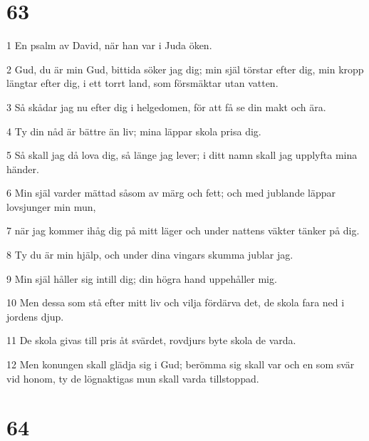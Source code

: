 \chapter{63}

\par 1 En psalm av David, när han var i Juda öken.
\par 2 Gud, du är min Gud, bittida söker jag dig; min själ törstar efter dig, min kropp längtar efter dig, i ett torrt land, som försmäktar utan vatten.
\par 3 Så skådar jag nu efter dig i helgedomen, för att få se din makt och ära.
\par 4 Ty din nåd är bättre än liv; mina läppar skola prisa dig.
\par 5 Så skall jag då lova dig, så länge jag lever; i ditt namn skall jag upplyfta mina händer.
\par 6 Min själ varder mättad såsom av märg och fett; och med jublande läppar lovsjunger min mun,
\par 7 när jag kommer ihåg dig på mitt läger och under nattens väkter tänker på dig.
\par 8 Ty du är min hjälp, och under dina vingars skumma jublar jag.
\par 9 Min själ håller sig intill dig; din högra hand uppehåller mig.
\par 10 Men dessa som stå efter mitt liv och vilja fördärva det, de skola fara ned i jordens djup.
\par 11 De skola givas till pris åt svärdet, rovdjurs byte skola de varda.
\par 12 Men konungen skall glädja sig i Gud; berömma sig skall var och en som svär vid honom, ty de lögnaktigas mun skall varda tillstoppad.

\chapter{64}

